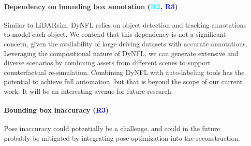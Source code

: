 \documentclass[10pt,twocolumn,letterpaper]{article}
\newcommand{\RTwo}{{\textcolor{cyan}{\textbf{R2}}}}
\newcommand{\RThree}{{\textcolor{blue}{\textbf{R3}}}}
\begin{document}
\paragraph{Dependency on bounding box annotation (\RTwo, \RThree)}
Similar to LiDARsim, DyNFL relies on object detection and tracking annotations to model each object. We contend that this dependency is not a significant concern, given the availability of large driving datasets with accurate annotations. Leveraging the compositional nature of DyNFL, we can generate extensive and diverse scenarios by combining assets from different scenes to support counterfactual re-simulation. Combining DyNFL with auto-labeling tools has the potential to achieve full automation, but that is beyond the scope of our current work. It will be an interesting avenue for future research.


\paragraph{Bounding box inaccuracy (\RThree)}
Pose inaccuracy could potentially be a challenge, and could in the future probably be mitigated by integrating pose optimization into the reconstruction.
\end{document}
